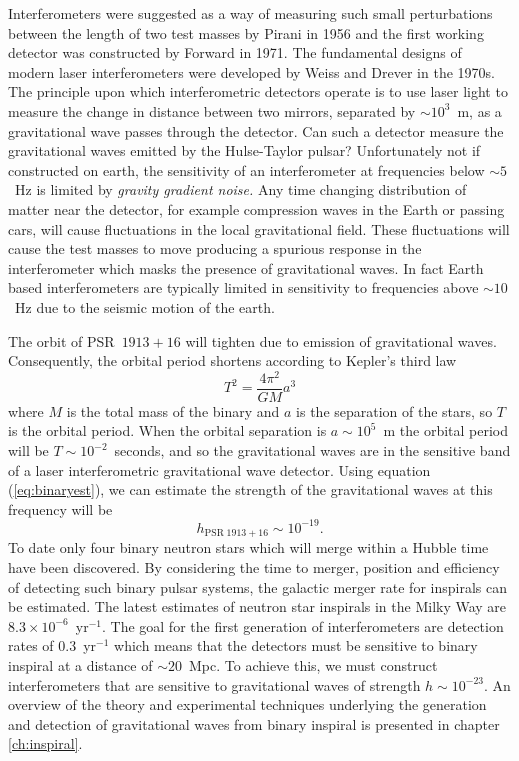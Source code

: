 Interferometers were suggested as a way of measuring such small
perturbations between the length of two test masses by Pirani in
1956\cite{Pirani:1956} and the first working detector was constructed by
Forward in 1971\cite{Forward:1971}. The fundamental designs of modern laser
interferometers were developed by Weiss\cite{Weiss:1972} and
Drever\cite{Drever:1980} in the 1970s. The principle upon which
interferometric detectors operate is to use laser light to measure the change
in distance between two mirrors, separated by $\sim 10^{3}$~m, as a
gravitational wave passes through the detector. Can such a detector measure
the gravitational waves emitted by the Hulse-Taylor pulsar? Unfortunately not
if constructed on earth\cite{Saulson:1994}, the sensitivity of an
interferometer at frequencies below $\sim 5$~Hz is limited by \emph{gravity
gradient noise.} Any time changing distribution of matter near the detector,
for example compression waves in the Earth or passing cars, will cause
fluctuations in the local gravitational field. These fluctuations will cause
the test masses to move producing a spurious response in the interferometer
which masks the presence of gravitational waves. In fact Earth based
interferometers are typically limited in sensitivity to frequencies above
$\sim 10$~Hz due to the seismic motion of the earth.

The orbit of PSR~$1913+16$ will tighten due to emission of gravitational waves.
Consequently, the orbital period shortens according to Kepler's third law
\begin{equation}
T^2 = \frac{4\pi^2}{GM}a^3
\end{equation}
where $M$ is the total mass of the binary and $a$ is the separation of the
stars, so $T$ is the orbital period. When the orbital separation is $a \sim
10^5$~m the orbital period will be $T\sim10^{-2}$~seconds, and so the
gravitational waves are in the sensitive band of a laser interferometric
gravitational wave detector. Using equation (\ref{eq:binaryest}), we
can estimate the strength of the gravitational waves at this frequency
will be
\begin{equation}
h_{\mathrm{PSR}\;1913+16} \sim 10^{-19}.
\label{eq:hbns}
\end{equation}
To date only four binary neutron stars which will merge within a Hubble time
have been discovered.  By considering the time to merger, position and
efficiency of detecting such binary pulsar systems, the galactic merger rate
for inspirals can be estimated\cite{Phinney:1991ei}.  The latest estimates of
neutron star inspirals in the Milky Way are $8.3 \times 10^{-6}$~yr$^{-1}$. The
goal for the first generation of interferometers are detection rates of
$0.3$~yr$^{-1}$ which means that the detectors must be sensitive to binary
inspiral at a distance of $\sim 20$~Mpc. To achieve this, we must construct
interferometers that are sensitive to gravitational waves of strength $h \sim
10^{-23}$. An overview of the theory and experimental techniques underlying
the generation and detection of gravitational waves from binary inspiral is
presented in chapter \ref{ch:inspiral}.

